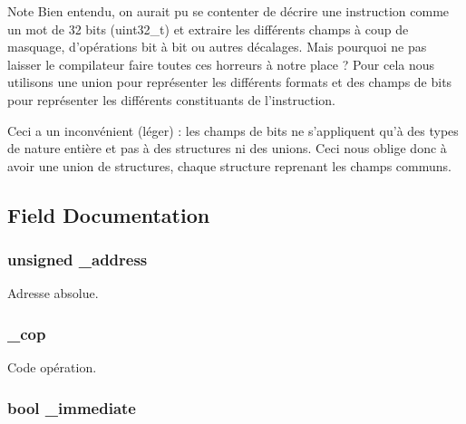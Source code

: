\begin{DoxyNote}{\-Note}
\-Bien entendu, on aurait pu se contenter de décrire une instruction comme un mot de 32 bits ({\ttfamily uint32\-\_\-t}) et extraire les différents champs à coup de masquage, d'opérations bit à bit ou autres décalages. \-Mais pourquoi ne pas laisser le compilateur faire toutes ces horreurs à notre place ? \-Pour cela nous utilisons une union pour représenter les différents formats et des champs de bits pour représenter les différents constituants de l'instruction.

\-Ceci a un inconvénient (léger) \-: les champs de bits ne s'appliquent qu'à des types de nature entière et pas à des structures ni des unions. \-Ceci nous oblige donc à avoir une union de structures, chaque structure reprenant les champs communs. 
\end{DoxyNote}


\subsection{\-Field \-Documentation}
\hypertarget{union_instruction_a7d8f71662d751668bc08cbac1c529124}{
\subsubsection[{\-\_\-address}]{\setlength{\rightskip}{0pt plus 5cm}unsigned {\bf \-\_\-address}}}\label{union_instruction_a7d8f71662d751668bc08cbac1c529124}


\-Adresse absolue. 

\hypertarget{union_instruction_a2eef4c29da07a7afefa510530aeabe8b}{
\subsubsection[{\-\_\-cop}]{ {\bf \-\_\-cop}}}\label{union_instruction_a2eef4c29da07a7afefa510530aeabe8b}


\-Code opération. 

\hypertarget{union_instruction_ae8f0aed9ccc5cc06e0689f32c409787d}{
\subsubsection[{\-\_\-immediate}]{\setlength{\rightskip}{0pt plus 5cm}bool {\bf \-\_\-immediate}}}\label{union_instruction_ae8f0aed9ccc5cc06e0689f32c409787d}


